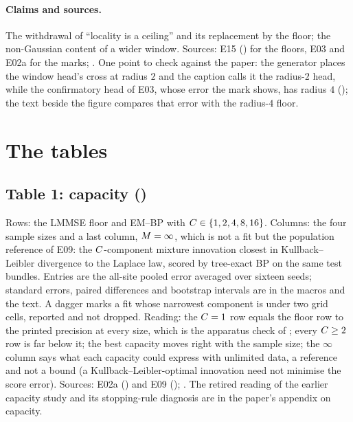 \paragraph{Claims and sources.} The withdrawal of ``locality is a ceiling'' and its
replacement by the floor; the non-Gaussian content of a wider window. Sources: E15
() for the floors, E03 and E02a for the marks;
. One point to check against the paper: the
generator places the window head's cross at radius $2$ and the caption calls it the
radius-$2$ head, while the confirmatory head of E03, whose error the mark shows, has
radius $4$ (); the text beside the figure compares that
error with the radius-$4$ floor.

\section{The tables}
\label{sec:tables}

\subsection{Table 1: capacity ()}

Rows: the LMMSE floor and EM--BP with $C\in\{1,2,4,8,16\}$. Columns: the four sample
sizes and a last column, $M=\infty$, which is not a fit but the population reference
of E09: the $C$-component mixture innovation closest in Kullback--Leibler divergence
to the Laplace law, scored by tree-exact BP on the same test bundles. Entries are the
all-site pooled error averaged over sixteen seeds; standard errors, paired differences
and bootstrap intervals are in the macros and the text. A dagger marks a fit whose
narrowest component is under two grid cells, reported and not dropped. Reading: the
$C=1$ row equals the floor row to the printed precision at every size, which is the
apparatus check of ; every $C\ge2$ row is far
below it; the best capacity moves right with the sample size; the $\infty$ column says
what each capacity could express with unlimited data, a reference and not a bound
(a Kullback--Leibler-optimal innovation need not minimise the score error). Sources:
E02a () and E09 ();
. The retired reading of the earlier capacity
study and its stopping-rule diagnosis are in the paper's appendix on capacity.

